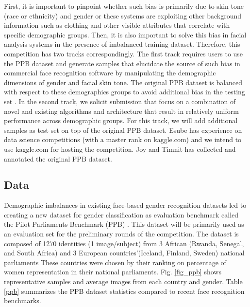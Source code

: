\documentclass[11pt, oneside]{article}
\makeatletter
\let\@internalcite\cite
\def\cite{\def\citeauthoryear##1##2{##1, ##2}\@internalcite}
\makeatother
\begin{document}
First, it is important to pinpoint whether such bias is primarily due to skin tone (race or ethnicity) and gender or these systems are exploiting other background information such as clothing and other visible attributes that correlate with specific demographic groups. Then, it is also important to solve this bias in facial analysis systems in the presence of imbalanced training dataset. Therefore, this competition has two tracks correspondingly. The first track requires users to use the PPB dataset and generate samples that elucidate the source of such bias in commercial face recognition software by manipulating the demographic dimensions of gender and facial skin tone. The original PPB dataset is balanced with respect to these demographics groups to avoid additional bias in the testing set \cite{buolamwini2018gender}. In the second track, we solicit submission that focus on a combination of novel and existing algorithms and architecture that result in relatively uniform performance across demographic groups. For this track, we will add additional samples as test set on top of the original PPB dataset. Esube has experience on data science competitions (with a master rank on kaggle.com) and we intend to use kaggle.com for hosting the competition. Joy and Timnit has collected and annotated the original PPB dataset.

\subsection{Data}

Demographic imbalances in existing face-based gender recognition datasets led to creating a new dataset for gender classification as evaluation benchmark called the Pilot Parliaments Benchmark (PPB) \cite{buolamwini2018gender}. This dataset will be primarily used as an evaluation set for the preliminary rounds of the competition. The dataset is composed of 1270 identities (1 image/subject) from 3 African (Rwanda, Senegal, and South Africa) and 3 European countries'(Iceland, Finland, Sweden) national parliaments These countries were chosen by their ranking on percentage of women representation in their national parliaments. Fig. \ref{fig_ppb} shows representative samples and average images from each country and gender. Table \ref{ppb} summarizes the PPB dataset statistics compared to recent face recognition benchmarks.
\end{document}
